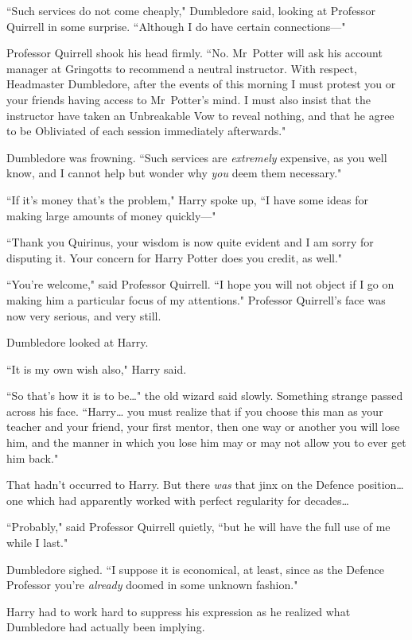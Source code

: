 ``Such services do not come cheaply," Dumbledore said, looking at Professor Quirrell in some surprise. ``Although I do have certain connections—"

Professor Quirrell shook his head firmly. ``No. Mr~Potter will ask his account manager at Gringotts to recommend a neutral instructor. With respect, Headmaster Dumbledore, after the events of this morning I must protest you or your friends having access to Mr~Potter's mind. I must also insist that the instructor have taken an Unbreakable Vow to reveal nothing, and that he agree to be Obliviated of each session immediately afterwards."

Dumbledore was frowning. ``Such services are \emph{extremely} expensive, as you well know, and I cannot help but wonder why \emph{you} deem them necessary."

``If it's money that's the problem," Harry spoke up, ``I have some ideas for making large amounts of money quickly—"

``Thank you Quirinus, your wisdom is now quite evident and I am sorry for disputing it. Your concern for Harry Potter does you credit, as well."

``You're welcome," said Professor Quirrell. ``I hope you will not object if I go on making him a particular focus of my attentions." Professor Quirrell's face was now very serious, and very still.

Dumbledore looked at Harry.

``It is my own wish also," Harry said.

``So that's how it is to be{\ldots}" the old wizard said slowly. Something strange passed across his face. ``Harry{\ldots} you must realize that if you choose this man as your teacher and your friend, your first mentor, then one way or another you will lose him, and the manner in which you lose him may or may not allow you to ever get him back."

That hadn't occurred to Harry. But there \emph{was} that jinx on the Defence position{\ldots} one which had apparently worked with perfect regularity for decades{\ldots}

``Probably," said Professor Quirrell quietly, ``but he will have the full use of me while I last."

Dumbledore sighed. ``I suppose it is economical, at least, since as the Defence Professor you're \emph{already} doomed in some unknown fashion."

Harry had to work hard to suppress his expression as he realized what Dumbledore had actually been implying.

